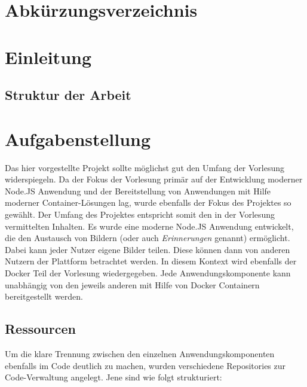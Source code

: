 \documentclass[12pt,a4paper]{report}
\begin{document}
\newpage
\chapter*{Abkürzungsverzeichnis}
\begin{acronym}[slmtA]
\end{acronym}  


\newpage
\tableofcontents

\newpage
\listoffigures

\newpage
\listoftables

\newpage
\chapter{Einleitung}

\section*{Struktur der Arbeit}

\newpage
\chapter{Aufgabenstellung}

Das hier vorgestellte Projekt sollte möglichst gut den Umfang der Vorlesung widerspiegeln. Da der Fokus der Vorlesung primär auf der Entwicklung moderner Node.JS Anwendung und der Bereitstellung von Anwendungen mit Hilfe moderner Container-Lösungen lag, wurde ebenfalls der Fokus des Projektes so gewählt. Der Umfang des Projektes entspricht somit den in der Vorlesung vermittelten Inhalten. Es wurde eine moderne Node.JS Anwendung entwickelt, die den Austausch von Bildern (oder auch \textit{Erinnerungen} genannt) ermöglicht. Dabei kann jeder Nutzer eigene Bilder teilen. Diese können dann von anderen Nutzern der Plattform betrachtet werden. In diesem Kontext wird ebenfalls der Docker Teil der Vorlesung wiedergegeben. Jede Anwendungskomponente kann unabhängig von den jeweils anderen mit Hilfe von Docker Containern bereitgestellt werden.

\section*{Ressourcen}
Um die klare Trennung zwischen den einzelnen Anwendungskomponenten ebenfalls im Code deutlich zu machen, wurden verschiedene Repositories zur Code-Verwaltung angelegt. Jene sind wie folgt strukturiert:
\end{document}
